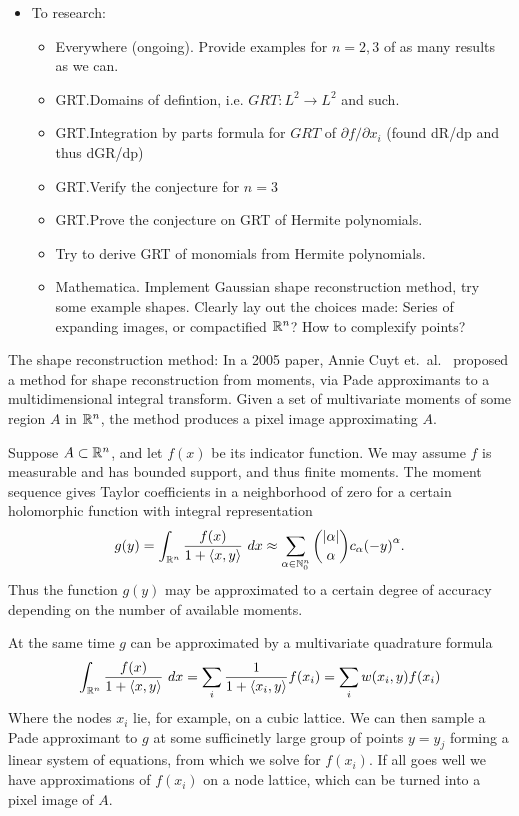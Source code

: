 \begin{itemize}
    \item To research:
    \begin{itemize}
        \item Everywhere (ongoing). Provide examples for $n = 2, 3$ of as many results as we can.
        \item GRT.\@ Domains of defintion, i.e. $GRT: L^2 \rightarrow L^2$ and such.
        \item GRT.\@ Integration by parts formula for $GRT$ of $\partial f/\partial x_i$ (found dR/dp and thus dGR/dp)
        \item GRT.\@ Verify the conjecture for $n=3$
        \item GRT.\@ Prove the conjecture on GRT of Hermite polynomials.
        \item Try to derive GRT of monomials from Hermite polynomials.
        \item Mathematica. Implement Gaussian shape reconstruction method, try some example shapes. Clearly lay out the choices made: Series of expanding images, or compactified $\mathbb{R}^n$? How to complexify points?
    \end{itemize}
\end{itemize}

The shape reconstruction method: In a 2005 paper, Annie Cuyt et.\ al.\ \cite{Cuyt05} proposed a method for shape reconstruction from moments, via Pade approximants to a multidimensional integral transform. Given a set of multivariate moments of some region $A$ in $\mathbb{R}^n$, the method produces a pixel image approximating $A$. 

Suppose $A \subset \mathbb{R}^n$, and let $f(x)$ be its indicator function. We may assume $f$ is measurable and has bounded support, and thus finite moments. The moment sequence gives Taylor coefficients in a neighborhood of zero for a certain holomorphic function with integral representation
\begin{align*}
    g(y) = \int_{\mathbb{R}^n} \frac{f(x)}{1 + \langle x, y\rangle} ~dx \approx \sum_{\alpha \in \mathbb{N}_0^n} \binom{|\alpha|}{\alpha} c_\alpha {(-y)}^\alpha.
\end{align*}
Thus the function $g(y)$ may be approximated to a certain degree of accuracy depending on the number of available moments.

At the same time $g$ can be approximated by a multivariate quadrature formula
\[
    \int_{\mathbb{R}^n} \frac{f(x)}{1 + \langle x, y\rangle} ~dx
    = \sum_{i} \frac1{1+\langle x_i, y\rangle} f(x_i)
    = \sum_{i} w(x_i, y) f(x_i)
\]
Where the nodes $x_i$ lie, for example, on a cubic lattice. We can then sample a Pade approximant to $g$ at some sufficinetly large group of points $y = y_j$ forming a linear system of equations, from which we solve for $f(x_i)$. If all goes well we have approximations of $f(x_i)$ on a node lattice, which can be turned into a pixel image of $A$.

